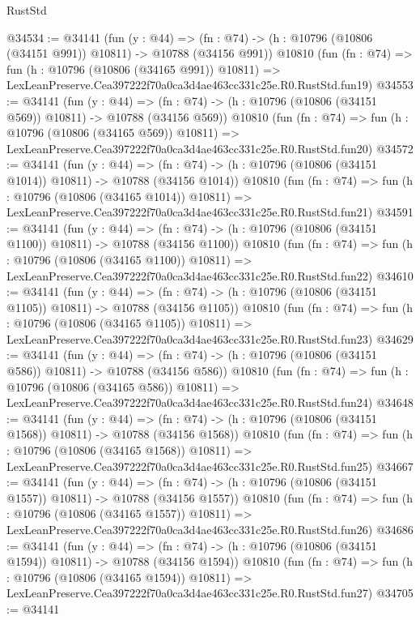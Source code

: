 \begin{lexlean}{RustStd}
\begin{coremodule}
@34534 := @34141
    (fun (y : @44) =>
    (fn : @74) -> (h : @10796 (@10806 (@34151 @991)) @10811) -> @10788 (@34156 @991))
    @10810
    (fun (fn : @74) =>
    fun (h : @10796 (@10806 (@34165 @991)) @10811) =>
    LexLeanPreserve.Cea397222f70a0ca3d4ae463cc331c25e.R0.RustStd.fun19)
@34553 := @34141
    (fun (y : @44) =>
    (fn : @74) -> (h : @10796 (@10806 (@34151 @569)) @10811) -> @10788 (@34156 @569))
    @10810
    (fun (fn : @74) =>
    fun (h : @10796 (@10806 (@34165 @569)) @10811) =>
    LexLeanPreserve.Cea397222f70a0ca3d4ae463cc331c25e.R0.RustStd.fun20)
@34572 := @34141
    (fun (y : @44) =>
    (fn : @74) -> (h : @10796 (@10806 (@34151 @1014)) @10811) -> @10788 (@34156 @1014))
    @10810
    (fun (fn : @74) =>
    fun (h : @10796 (@10806 (@34165 @1014)) @10811) =>
    LexLeanPreserve.Cea397222f70a0ca3d4ae463cc331c25e.R0.RustStd.fun21)
@34591 := @34141
    (fun (y : @44) =>
    (fn : @74) -> (h : @10796 (@10806 (@34151 @1100)) @10811) -> @10788 (@34156 @1100))
    @10810
    (fun (fn : @74) =>
    fun (h : @10796 (@10806 (@34165 @1100)) @10811) =>
    LexLeanPreserve.Cea397222f70a0ca3d4ae463cc331c25e.R0.RustStd.fun22)
@34610 := @34141
    (fun (y : @44) =>
    (fn : @74) -> (h : @10796 (@10806 (@34151 @1105)) @10811) -> @10788 (@34156 @1105))
    @10810
    (fun (fn : @74) =>
    fun (h : @10796 (@10806 (@34165 @1105)) @10811) =>
    LexLeanPreserve.Cea397222f70a0ca3d4ae463cc331c25e.R0.RustStd.fun23)
@34629 := @34141
    (fun (y : @44) =>
    (fn : @74) -> (h : @10796 (@10806 (@34151 @586)) @10811) -> @10788 (@34156 @586))
    @10810
    (fun (fn : @74) =>
    fun (h : @10796 (@10806 (@34165 @586)) @10811) =>
    LexLeanPreserve.Cea397222f70a0ca3d4ae463cc331c25e.R0.RustStd.fun24)
@34648 := @34141
    (fun (y : @44) =>
    (fn : @74) -> (h : @10796 (@10806 (@34151 @1568)) @10811) -> @10788 (@34156 @1568))
    @10810
    (fun (fn : @74) =>
    fun (h : @10796 (@10806 (@34165 @1568)) @10811) =>
    LexLeanPreserve.Cea397222f70a0ca3d4ae463cc331c25e.R0.RustStd.fun25)
@34667 := @34141
    (fun (y : @44) =>
    (fn : @74) -> (h : @10796 (@10806 (@34151 @1557)) @10811) -> @10788 (@34156 @1557))
    @10810
    (fun (fn : @74) =>
    fun (h : @10796 (@10806 (@34165 @1557)) @10811) =>
    LexLeanPreserve.Cea397222f70a0ca3d4ae463cc331c25e.R0.RustStd.fun26)
@34686 := @34141
    (fun (y : @44) =>
    (fn : @74) -> (h : @10796 (@10806 (@34151 @1594)) @10811) -> @10788 (@34156 @1594))
    @10810
    (fun (fn : @74) =>
    fun (h : @10796 (@10806 (@34165 @1594)) @10811) =>
    LexLeanPreserve.Cea397222f70a0ca3d4ae463cc331c25e.R0.RustStd.fun27)
@34705 := @34141

\end{coremodule}
\end{lexlean}
